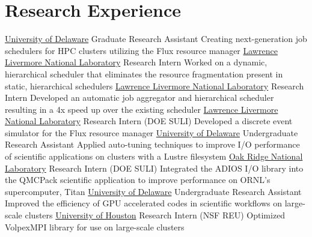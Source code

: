 \section{Research Experience}
		{\href{https://www.udel.edu}{University of Delaware}}
		{Graduate Research Assistant}
		{}{}
		{Creating next-generation job schedulers for HPC clusters utilizing the Flux resource manager}
		{\href{https://www.llnl.gov}{Lawrence Livermore National Laboratory}}
		{Research Intern}
		{}{}
		{Worked on a dynamic, hierarchical scheduler that eliminates the resource fragmentation present in static, hierarchical schedulers}
		{\href{https://www.llnl.gov}{Lawrence Livermore National Laboratory}}
		{Research Intern}
		{}{}
		{Developed an automatic job aggregator and hierarchical scheduler resulting in a 4x speed up over the existing scheduler}
		{\href{https://www.llnl.gov}{Lawrence Livermore National Laboratory}}
		{Research Intern (DOE SULI)}
		{}{}
		{Developed a discrete event simulator for the Flux resource manager}
		{\href{http://www.udel.edu}{University of Delaware}}
		{Undergraduate Research Assistant}
		{}{}
		{Applied auto-tuning techniques to improve I/O performance of scientific applications on clusters with a Lustre filesystem}
		{\href{https://www.ornl.gov}{Oak Ridge National Laboratory}}
		{Research Intern (DOE SULI)}
		{}{}
		{Integrated the ADIOS I/O library into the QMCPack scientific application to improve performance on ORNL’s supercomputer, Titan}
		{\href{http://www.udel.edu}{University of Delaware}}
		{Undergraduate Research Assistant}
		{}{}
		{Improved the efficiency of GPU accelerated codes in scientific workflows on large-scale clusters}
		{\href{http://uh.edu}{University of Houston}}
		{Research Intern (NSF REU)}
		{}{}
		{Optimized VolpexMPI library for use on large-scale clusters}

